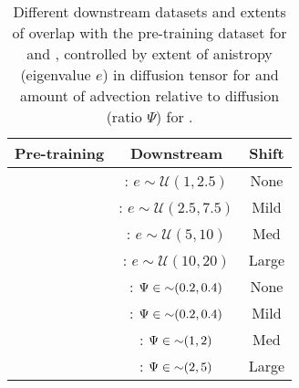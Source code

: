\begin{table}[!htbp]
		\caption{Different downstream datasets and extents of overlap with the pre-training dataset for \sysA{} and \sysB{}, controlled by extent of anistropy (eigenvalue $e$) in diffusion tensor for \sysA{} and amount of advection relative to diffusion (ratio $\Psi$) for \sysB{}.
		\label{tab:systems}
		}
		\centering
		\begin{small}
			\begin{tabular}{c|c|c}
				 Pre-training  & Downstream  &   Shift \\
                    \hline
                     \multirow{4}{*}{\centering{\sysAonefive{}: $e \sim \mathcal{U}(1, 5)$}} & \sysAonetwoptfive{}: $e \sim \mathcal{U}(1, 2.5)$ & None \\
                    & \sysAtwoptfivesevenptfive{}: $e \sim \mathcal{U}(2.5, 7.5)$ & Mild\\
                    & \sysAfiveten{}: $e \sim \mathcal{U}(5, 10)$ & Med \\
                    & \sysAtentwenty{}: $e \sim \mathcal{U}(10, 20)$ & Large \\
                    \midrule
                    \multirow{4}{*}{\centering{\sysBzeropttwoone{}: $\Psi \in {\small \sim}(0.2, 1)$}} & \sysBzeropttwozeroptfour{}: $\Psi \in {\small \sim}(0.2, 0.4)$ & None \\
                    & \sysBzeropttwozeroptfour{}: $\Psi \in {\small \sim}(0.2, 0.4)$ & Mild\\
                    & \sysBonetwo{}: $\Psi \in {\small \sim}(1, 2)$ & Med \\
                    & \sysBtwofive{}: $\Psi \in {\small \sim}(2, 5)$ & Large \\
			\end{tabular}
		\end{small}
\end{table}

